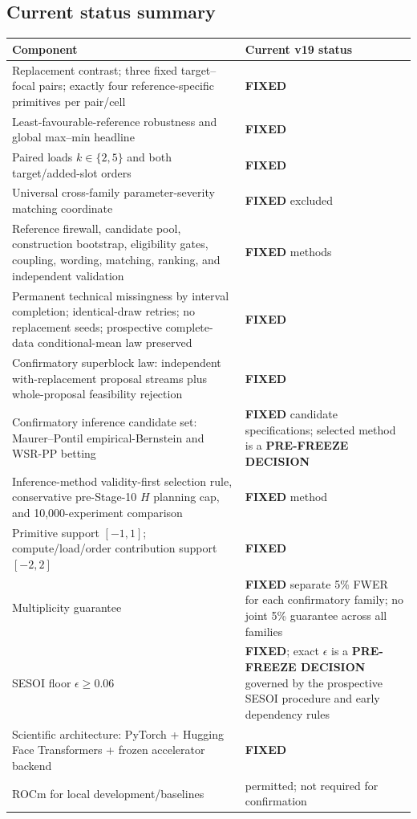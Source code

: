 \documentclass[11pt,a4paper]{article}
\newcommand{\FIXED}{\textbf{FIXED}}
\newcommand{\PFD}{\textbf{PRE-FREEZE DECISION}}
\begin{document}
\subsection{Current status summary}
\begin{longtable}{p{}p{}}
\toprule
\textbf{Component} & \textbf{Current v19 status} \\
\midrule
\endhead
Replacement contrast; three fixed target--focal pairs; exactly four reference-specific primitives per pair/cell & \FIXED{} \\
Least-favourable-reference robustness and global max--min headline & \FIXED{} \\
Paired loads $k\in\{2,5\}$ and both target/added-slot orders & \FIXED{} \\
Universal cross-family parameter-severity matching coordinate & \FIXED{} excluded \\
Reference firewall, candidate pool, construction bootstrap, eligibility gates, coupling, wording, matching, ranking, and independent validation & \FIXED{} methods \\
Permanent technical missingness by interval completion; identical-draw retries; no replacement seeds; prospective complete-data conditional-mean law preserved & \FIXED{} \\
Confirmatory superblock law: independent with-replacement proposal streams plus whole-proposal feasibility rejection & \FIXED{} \\
Confirmatory inference candidate set: Maurer--Pontil empirical-Bernstein and WSR-PP betting & \FIXED{} candidate specifications; selected method is a \PFD{} \\
Inference-method validity-first selection rule, conservative pre-Stage-10 $H$ planning cap, and 10,000-experiment comparison & \FIXED{} method \\
Primitive support $[-1,1]$; compute/load/order contribution support $[-2,2]$ & \FIXED{} \\
Multiplicity guarantee & \FIXED{} separate 5\% FWER for each confirmatory family; no joint 5\% guarantee across all families \\
SESOI floor $\epsilon\ge0.06$ & \FIXED{}; exact $\epsilon$ is a \PFD{} governed by the prospective SESOI procedure and early dependency rules \\
Scientific architecture: PyTorch + Hugging Face Transformers + frozen accelerator backend & \FIXED{} \\
ROCm for local development/baselines & permitted; not required for confirmation \\

\end{longtable}
\end{document}
